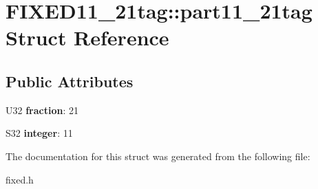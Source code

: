 \hypertarget{struct_f_i_x_e_d11__21tag_1_1part11__21tag}{
\section{FIXED11\_\-21tag::part11\_\-21tag Struct Reference}
\label{struct_f_i_x_e_d11__21tag_1_1part11__21tag}
}
\subsection*{Public Attributes}
\begin{DoxyCompactItemize}
\item 
\hypertarget{struct_f_i_x_e_d11__21tag_1_1part11__21tag_a84acb43bd317b9526c27b89dd79ac7cd}{
U32 {\bfseries fraction}: 21}
\label{struct_f_i_x_e_d11__21tag_1_1part11__21tag_a84acb43bd317b9526c27b89dd79ac7cd}

\item 
\hypertarget{struct_f_i_x_e_d11__21tag_1_1part11__21tag_ab95a0374e1e549857488040e107eea58}{
S32 {\bfseries integer}: 11}
\label{struct_f_i_x_e_d11__21tag_1_1part11__21tag_ab95a0374e1e549857488040e107eea58}

\end{DoxyCompactItemize}


The documentation for this struct was generated from the following file:\begin{DoxyCompactItemize}
\item 
fixed.h\end{DoxyCompactItemize}
